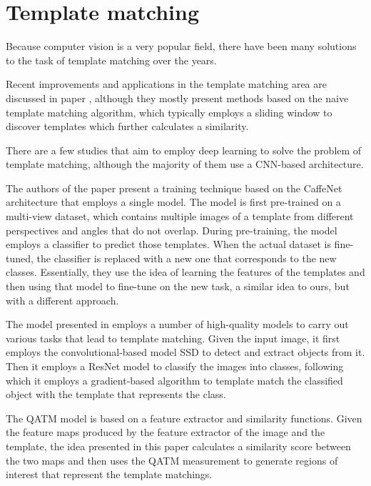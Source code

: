 \documentclass{report}[12pt, a4paper]
\begin{document}
\section{Template matching}

Because computer vision is a very popular field, there have been many solutions to the task of template matching over the years.

Recent improvements and applications in the template matching area are discussed in paper \cite{template_matching_methods_paper}, although they mostly present methods based on the naive template matching algorithm, which typically employs a sliding window to discover templates which further calculates a similarity.

There are a few studies that aim to employ deep learning to solve the problem of template matching, although the majority of them use a CNN-based architecture.

The authors of the paper \cite{robust_template_matching_paper} present a training technique based on the CaffeNet\cite{caffenet_paper} architecture that employs a single model. The model is first pre-trained on a multi-view dataset, which contains multiple images of a template from different perspectives and angles that do not overlap. During pre-training, the model employs a classifier to predict those templates. When the actual dataset is fine-tuned, the classifier is replaced with a new one that corresponds to the new classes. Essentially, they use the idea of learning the features of the templates and then using that model to fine-tune on the new task, a similar idea to ours, but with a different approach.

The model presented in \cite{deep_object_template_matching_paper} employs a number of high-quality models to carry out various tasks that lead to template matching. Given the input image, it first employs the convolutional-based model SSD\cite{ssd300} to detect and extract objects from it. Then it employs a ResNet\cite{resnet_paper} model to classify the images into classes, following which it employs a gradient-based algorithm to template match the classified object with the template that represents the class.

The QATM model \cite{qatm_paper} is based on a feature extractor and similarity functions. Given the feature maps produced by the feature extractor of the image and the template, the idea presented in this paper calculates a similarity score between the two maps and then uses the QATM measurement to generate regions of interest that represent the template matchings.
\end{document}
